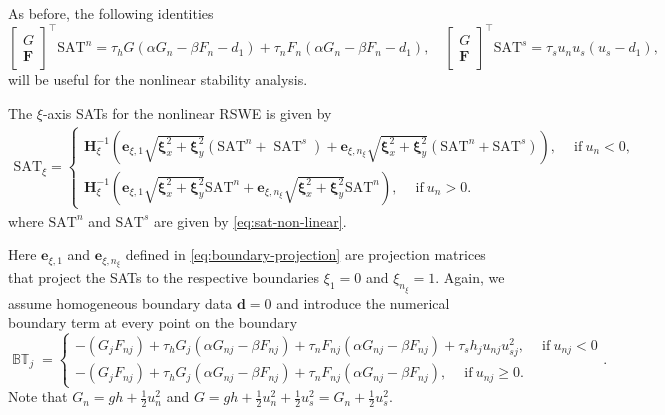 \documentclass{article}
\numberwithin{equation}{section}
\theoremstyle{definition}
\begin{document}
\noindent
As before, the following identities 
$$
\begin{bmatrix}
    G\\
    \bm{F}
\end{bmatrix}^\top \mathrm{SAT}^{n} 
= 
\tau_h G \left(\alpha G_n - \beta F_n- d_1\right) + \tau_n F_n \left(\alpha G_n - \beta F_n- d_1\right),
     \quad
\begin{bmatrix}
    G\\
    \bm{F}
\end{bmatrix}^\top\mathrm{SAT}^{s} 
= 
\tau_s  u_n u_s \left(u_s- d_1\right), 
$$
will be useful for the nonlinear stability analysis.

The $\xi$-axis SATs for the nonlinear RSWE is given by
\begin{eqnarray}
\mathrm{SAT}_\xi=
 \begin{cases}
    \bm{H}_{\xi}^{-1}\left(\mathbf{e}_{\xi, 1}\sqrt{\bm{\xi}_x^2 + \bm{\xi}_y^2}\left(\mathrm{SAT}^{n} + \operatorname{SAT}^{s}\right) + \mathbf{e}_{\xi, n_\xi}\sqrt{\bm{\xi}_x^2 + \bm{\xi}_y^2}\left(\mathrm{SAT}^{n} + \mathrm{SAT}^{s}\right)\right), \quad \ \text{if} \ u_n < 0, \\
   \bm{H}_{\xi}^{-1}\left(\mathbf{e}_{\xi,1}\sqrt{\bm{\xi}_x^2 + \bm{\xi}_y^2}\mathrm{SAT}^{n} + \mathbf{e}_{\xi,n_\xi}\sqrt{\bm{\xi}_x^2 + \bm{\xi}_y^2}\mathrm{SAT}^{n}\right), \quad \ \text{if} \ u_n > 0.
    \end{cases}
\end{eqnarray}
where $\mathrm{SAT}^{n}$ and $\mathrm{SAT}^{s}$ are given by \eqref{eq:sat-non-linear}.

Here $\mathbf{e}_{\xi,1}$ and  $\mathbf{e}_{\xi,n_\xi}$ defined in \eqref{eq:boundary-projection} are projection matrices that project the SATs to the respective boundaries $\xi_1 =0$ and $\xi_{n_\xi} = 1$. Again, we assume homogeneous boundary data $\bm{d}=0$ and introduce the numerical boundary term at every point on the boundary
\begin{equation}\label{eq:boundary-term-pointwise-nonlinear}
    \operatorname{\mathbb{BT}}_j =
\begin{cases}
-\left(G_{j}F_{nj}\right)+ \tau_h G_{j} \left(\alpha G_{nj} - \beta F_{nj}\right) +
     \tau_n F_{nj}\left(\alpha G_{nj} - \beta F_{nj}\right) + \tau_s h_{j} u_{nj} u_{sj}^2, \quad \ \text{if} \ u_{nj} < 0\\
%     
-\left(G_{j}F_{nj}\right)+ \tau_h G_{j} \left(\alpha G_{nj} - \beta F_{nj}\right) +
     \tau_n F_{nj}\left(\alpha G_{nj} - \beta F_{nj}\right) , \quad \ \text{if} \ u_{nj} \ge  0.
     \end{cases}.
\end{equation}
Note that 
$
G_n = gh + \frac{1}{2}u_n^2 
$
and 
$G = gh + \frac{1}{2}u_n^2 + \frac{1}{2}u_s^2  = G_n + \frac{1}{2}u_s^2 $.
\end{document}

